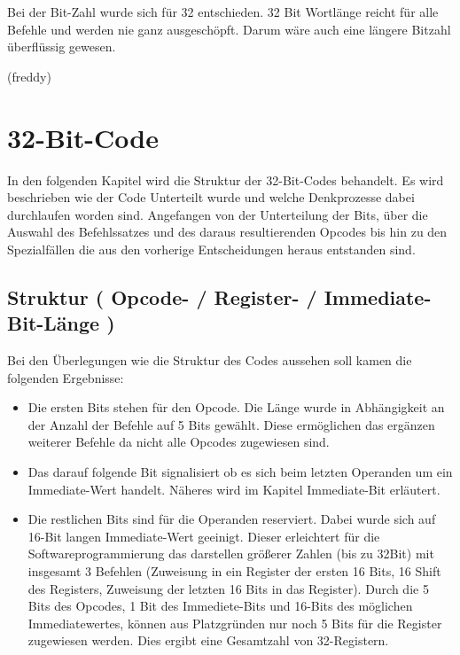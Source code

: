 \documentclass[paper=a4,fontsize=12pt,twocolumn]{scrreprt}
\begin{document}
Bei der Bit-Zahl wurde sich für 32 entschieden. 32 Bit Wortlänge reicht für alle Befehle und werden nie ganz ausgeschöpft. Darum wäre auch eine längere Bitzahl überflüssig gewesen.

(freddy)



\section{32-Bit-Code}

In den folgenden Kapitel wird die Struktur der 32-Bit-Codes behandelt. Es wird beschrieben wie der Code Unterteilt wurde und welche Denkprozesse dabei durchlaufen worden sind. Angefangen von der Unterteilung der Bits, über die Auswahl des Befehlssatzes und des daraus resultierenden Opcodes bis hin zu den Spezialfällen die aus den vorherige Entscheidungen heraus entstanden sind. 

\subsection{Struktur ( Opcode- / Register- / Immediate- Bit-Länge )}

Bei den Überlegungen wie die Struktur des Codes aussehen soll kamen die folgenden Ergebnisse: 
\begin{itemize}
    \item Die ersten Bits stehen für den Opcode. Die Länge wurde in Abhängigkeit an der Anzahl der Befehle auf 5 Bits gewählt. Diese ermöglichen das ergänzen weiterer Befehle da nicht alle Opcodes zugewiesen sind. 
    \item Das darauf folgende Bit signalisiert ob es sich beim letzten Operanden um ein Immediate-Wert handelt. Näheres wird im Kapitel Immediate-Bit erläutert.
    \item Die restlichen Bits sind für die Operanden reserviert. Dabei wurde sich auf 16-Bit langen Immediate-Wert geeinigt. Dieser erleichtert für die Softwareprogrammierung das darstellen größerer Zahlen (bis zu 32Bit) mit insgesamt 3 Befehlen (Zuweisung in ein Register der ersten 16 Bits, 16 Shift des Registers, Zuweisung der letzten 16 Bits in das Register). 
    Durch die 5 Bits des Opcodes, 1 Bit des Immediete-Bits und 16-Bits des möglichen Immediatewertes, können aus Platzgründen nur noch 5 Bits für die Register zugewiesen werden. Dies ergibt eine Gesamtzahl von 32-Registern. 
    
\end{itemize}
\end{document}
